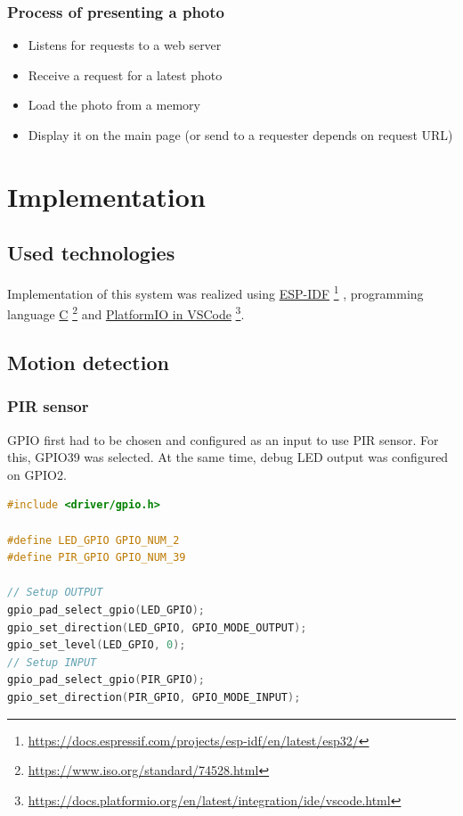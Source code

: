 \documentclass{article}
\begin{document}
    \subsubsection{Process of presenting a photo}
    \begin{itemize}
        \item Listens for requests to a web server
        \item Receive a request for a latest photo
        \item Load the photo from a memory
        \item Display it on the main page
            (or send to a requester depends on request
            URL)
    \end{itemize}
    
    \section{Implementation}
    
    \subsection{Used technologies}
    Implementation of this system was realized using 
    \href{https://docs.espressif.com/projects/esp-idf/en/latest/esp32/}{ESP-IDF}
    \footnote{\url{https://docs.espressif.com/projects/esp-idf/en/latest/esp32/}}
    , programming language \href{https://www.iso.org/standard/74528.html}{C}
    \footnote{\url{https://www.iso.org/standard/74528.html}} and 
    \href{https://docs.platformio.org/en/latest/integration/ide/vscode.html}{PlatformIO in VSCode}
    \footnote{\url{https://docs.platformio.org/en/latest/integration/ide/vscode.html}}.
    
    \subsection{Motion detection}
    \subsubsection{PIR sensor}
    GPIO first had to be chosen and configured as an input to use PIR sensor.
    For this, GPIO39 was selected. At the same time, debug LED output was configured
    on GPIO2.
    \begin{lstlisting}[language=C]
#include <driver/gpio.h>

#define LED_GPIO GPIO_NUM_2
#define PIR_GPIO GPIO_NUM_39

// Setup OUTPUT
gpio_pad_select_gpio(LED_GPIO);
gpio_set_direction(LED_GPIO, GPIO_MODE_OUTPUT);
gpio_set_level(LED_GPIO, 0);
// Setup INPUT
gpio_pad_select_gpio(PIR_GPIO);
gpio_set_direction(PIR_GPIO, GPIO_MODE_INPUT);
    \end{lstlisting}
    
\end{document}
